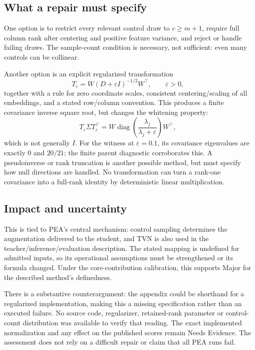 \documentclass[10pt]{article}
\begin{document}
\subsection*{What a repair must specify}
One option is to restrict every relevant control draw to \(c\ge m+1\), require full column rank after centering and positive feature variance, and reject or handle failing draws. The sample-count condition is necessary, not sufficient: even many controls can be collinear.\par
Another option is an explicit regularized transformation \[T_\varepsilon=W(D+\varepsilon I)^{-1/2}W^\top,\qquad \varepsilon>0,\] together with a rule for zero coordinate scales, consistent centering/scaling of all embeddings, and a stated row/column convention. This produces a finite covariance inverse square root, but changes the whitening property: \[T_\varepsilon\Sigma T_\varepsilon^\top
=W\operatorname{diag}\!\left(\frac{\lambda_j}{\lambda_j+\varepsilon}\right)W^\top,\] which is not generally \(I\). For the witness at \(\varepsilon=0.1\), its covariance eigenvalues are exactly \(0\) and \(20/21\); the finite parent diagnostic corroborates this. A pseudoinverse or rank truncation is another possible method, but must specify how null directions are handled. No transformation can turn a rank-one covariance into a full-rank identity by deterministic linear multiplication.\par
\subsection*{Impact and uncertainty}
This is tied to PEA’s central mechanism: control sampling determines the augmentation delivered to the student, and TVN is also used in the teacher/inference/evaluation description. The stated mapping is undefined for admitted inputs, so its operational assumptions must be strengthened or its formula changed. Under the core-contribution calibration, this supports Major for the described method’s definedness.\par
There is a substantive counterargument: the appendix could be shorthand for a regularized implementation, making this a missing specification rather than an executed failure. No source code, regularizer, retained-rank parameter or control-count distribution was available to verify that reading. The exact implemented normalization and any effect on the published scores remain Needs Evidence. The assessment does not rely on a difficult repair or claim that all PEA runs fail.\par
\end{document}
